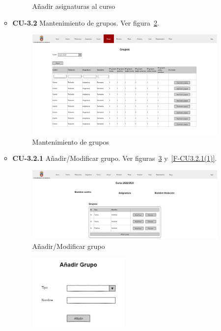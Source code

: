 \begin{itemize}
\begin{itemize}
\begin{figure}[!h]
		\caption{Añadir asignaturas al curso}\label{F-CU3.1.2(1)}
		\end{figure}
		\FloatBarrier
\newpage
		\item \textbf{CU-3.2} Mantenimiento de grupos. Ver figura~\ref{F-CU3.2}.
		\begin{figure}[!h]
		\centering
		\includegraphics[width=\textwidth]{../img/Anexos/Vistas/grupos.png}
		\caption{Mantenimiento de grupos}\label{F-CU3.2}
		\end{figure}
		\FloatBarrier
		\item \textbf{CU-3.2.1} Añadir/Modificar grupo. Ver figuras~\ref{F-CU3.2.1} y~\ref{F-CU3.2.1(1)}.
		\begin{figure}[!h]
		\centering
		\includegraphics[width=\textwidth]{../img/Anexos/Vistas/addmod_grupo.png}
		\caption{Añadir/Modificar grupo}\label{F-CU3.2.1}
		\end{figure}
		\FloatBarrier
		\begin{figure}[!h]
		\centering
		\includegraphics[width=0.5\textwidth]{../img/Anexos/Vistas/add_grupo.png}

\end{figure}
\end{itemize}
\end{itemize}
